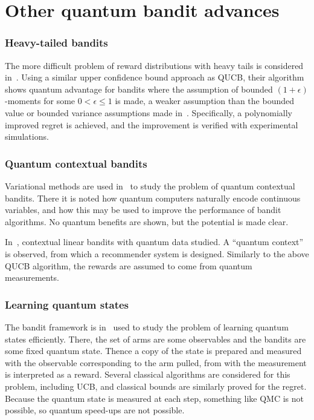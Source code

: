 \section{Other quantum bandit advances}
\label{sec:qbandits_other}

\subsubsection{Heavy-tailed bandits}
The more difficult problem of reward distributions with heavy tails is considered in~\autocite{wu2023}.
Using a similar upper confidence bound approach as QUCB, their algorithm shows quantum advantage for bandits where the assumption of bounded $(1 + \epsilon)$-moments for some $0<\epsilon \leq 1$ is made, a weaker assumption than the bounded value or bounded variance assumptions made in~\autocite{wan2022}.
Specifically, a polynomially improved regret is achieved, and the improvement is verified with experimental simulations.

\subsubsection{Quantum contextual bandits}
Variational methods are used in~\autocite{hu2019} to study the problem of quantum contextual bandits.
There it is noted how quantum computers naturally encode continuous variables, and how this may be used to improve the performance of bandit algorithms.
No quantum benefits are shown, but the potential is made clear.

In~\autocite{brahmachari2023}, contextual linear bandits with quantum data studied.
A \enquote{quantum context} is observed, from which a recommender system is designed.
Similarly to the above QUCB algorithm, the rewards are assumed to come from quantum measurements.


\subsubsection{Learning quantum states}
The bandit framework is in~\autocite{lumbreras2022} used to study the problem of learning quantum states efficiently.
There, the set of arms are some observables and the bandits are some fixed quantum state.
Thence a copy of the state is prepared and measured with the observable corresponding to the arm pulled, from with the measurement is interpreted as a reward.
Several classical algorithms are considered for this problem, including UCB, and classical bounds are similarly proved for the regret.
Because the quantum state is measured at each step, something like QMC is not possible, so quantum speed-ups are not possible.


